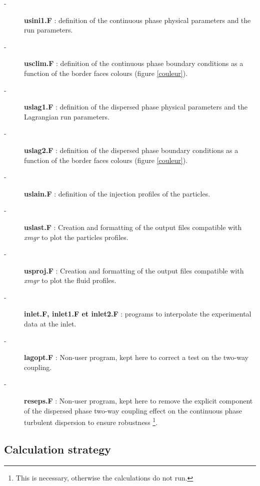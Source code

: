 \documentclass[a4paper,twoside,12pt]{article}
\begin{document}
\begin{description}

   \item[-] \textbf{usini1.F} : definition of the continuous phase physical parameters and the run parameters.

   \item[-] \textbf{usclim.F} : definition of the continuous phase boundary conditions as a function of the border faces colours (figure \ref{couleur}).

   \item[-] \textbf{uslag1.F} : definition of the dispersed phase physical parameters and the Lagrangian run parameters.

   \item[-] \textbf{uslag2.F} :  definition of the dispersed phase boundary conditions as a function of the border faces colours
         (figure \ref{couleur}).

   \item[-] \textbf{uslain.F} : definition of the injection profiles of the particles.

   \item[-] \textbf{uslast.F} : Creation and formatting of the output files compatible with \textit{xmgr} to plot the particles profiles.

   \item[-] \textbf{usproj.F} : Creation and formatting of the output files compatible with \textit{xmgr} to plot the fluid profiles.

   \item[-] \textbf{inlet.F, inlet1.F et inlet2.F} : programs to interpolate the experimental data at the inlet.

   \item[-] \textbf{lagopt.F} : Non-user program, kept here to correct a test on the two-way coupling.

   \item[-] \textbf{reseps.F} : Non-user program, kept here to remove the explicit component of the dispersed phase two-way coupling effect on the continuous phase turbulent dispersion to ensure robustness \footnote{This is necessary, otherwise the calculations do not run.}.

\end{description}

\subsection{Calculation strategy}
\end{document}
